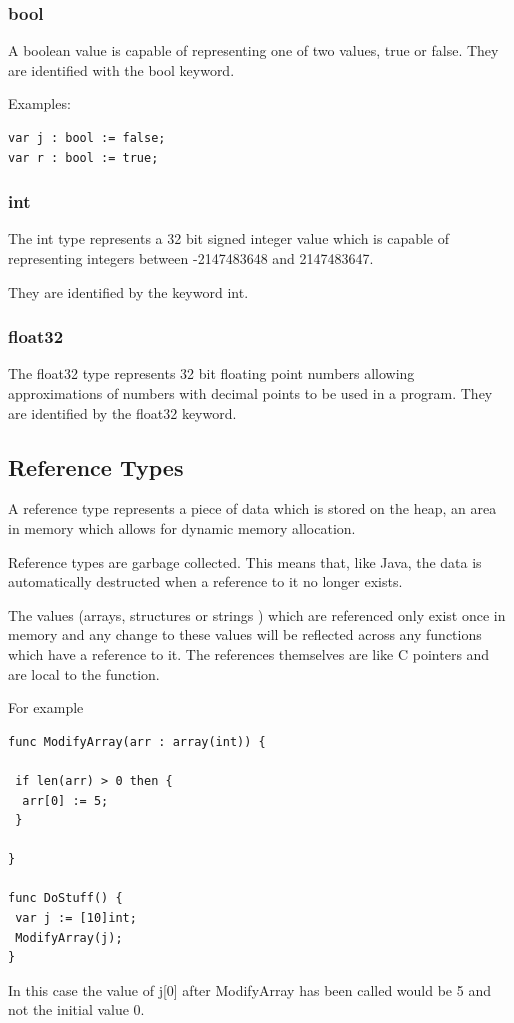 \documentclass[]{final_report}
\begin{document}
\subsubsection{bool}

A boolean value is capable of representing one of two values, true or false. They are identified with the bool keyword.

Examples:
\begin{verbatim}
var j : bool := false;
var r : bool := true;
\end{verbatim}

\subsubsection{int}

The int type represents a 32 bit signed integer value which is capable of representing integers between -2147483648 and 2147483647.

They are identified by the keyword int. 

\subsubsection{float32}

The float32 type represents 32 bit floating point numbers allowing approximations of numbers with decimal points to be used in a program. They are identified by the float32 keyword.

\subsection{Reference Types}

A reference type represents a piece of data which is stored on the heap, an area in memory which allows for dynamic memory allocation.

Reference types are garbage collected. This means that, like Java, the data is automatically destructed when a reference to it no longer exists.

The values (arrays, structures or strings ) which are referenced only exist once in memory and any change to these values will be reflected across any functions which have a reference to it. The references themselves are like C pointers and are local to the function.

For example
\begin{verbatim}
func ModifyArray(arr : array(int)) {

 if len(arr) > 0 then {
  arr[0] := 5;
 }

}

func DoStuff() {
 var j := [10]int;
 ModifyArray(j);
}
\end{verbatim}
In this case the value of j[0] after ModifyArray has been called would be 5 and not the initial value 0.
\end{document}
